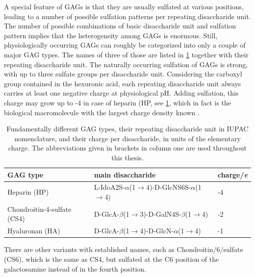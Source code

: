 A special feature of GAGs is that they are usually sulfated at various
positions, leading to a number of possible sulfation patterns per repeating
disaccharide unit. The number of possible combinations of basic disaccharide
unit and sulfation pattern implies that the heterogeneity among GAGs is
enormous. Still, physiologically occurring GAGs can roughly be categorized into
only a couple of major GAG types. The names of three of those are listed in
\cref{tab:bg:gagtypes} together with their repeating disaccharide unit. The
naturally occurring sulfation of GAGs is strong, with up to three sulfate groups
per disaccharide unit. Considering the carboxyl group contained in the hexuronic
acid, each repeating disaccharide unit always carries at least one negative
charge at physiological pH. Adding sulfation, this charge may grow up to -4 in
case of heparin (HP, see \cref{tab:bg:gagtypes}, which in fact is the biological
macromolecule with the largest charge density known
\cite{capila_linhardt_hep_prot_2002}.

\begin{table}
\scriptsize
\centering
\renewcommand{\arraystretch}{1.3}
\begin{tabular}{lll}
\midrule
GAG type & main disaccharide & charge/\si{\elementarycharge} \\
\midrule
Heparin (HP) & L-IdoA2S-$\alpha$(1$\rightarrow$4)-D-GlcNS6S-$\alpha$(1$\rightarrow$4) & -4 \\
Chondroitin-4-sulfate (CS4) & D-GlcA-$\beta$(1$\rightarrow$3)-D-GalN4S-$\beta$(1$\rightarrow$4) & -2 \\
Hyaluronan (HA) & D-GlcA-$\beta$(1$\rightarrow$4)-D-GlcN-$\alpha$(1$\rightarrow$4) & -1 \\
\midrule
\end{tabular}
\caption{
Fundamentally different GAG types, their repeating disaccharide unit in IUPAC
nomenclature, and their charge per disaccharide, in units of the elementary
charge. The abbreviations given in brackets in column one are used throughout
this thesis.}
\label{tab:bg:gagtypes}
\end{table}


There are other variants with established names, such as
Chondroitin\-/6\-/sulfate (CS6), which is the same as CS4, but sulfated at the
C6 position of the galactosamine instead of in the fourth position.

